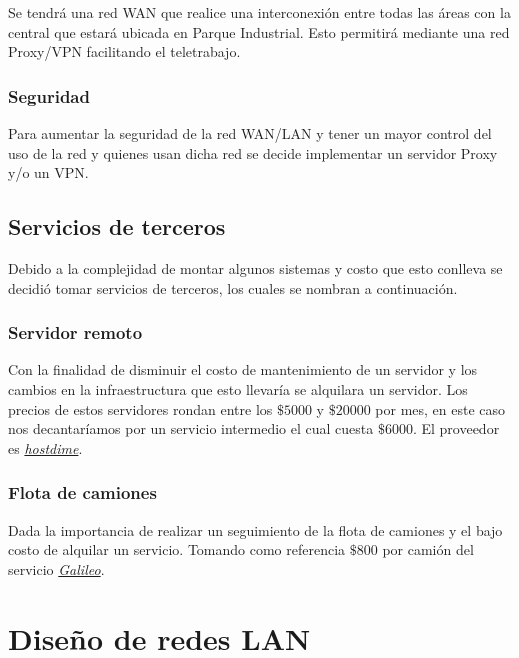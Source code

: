 \documentclass[11pt]{article}
\begin{document}
        Se tendrá una red WAN que realice una interconexión entre todas las áreas con la central que estará ubicada en Parque Industrial.
        Esto permitirá mediante una red Proxy/VPN facilitando el teletrabajo.

        \subsubsection*{Seguridad}

        Para aumentar la seguridad de la red WAN/LAN y tener un mayor control del uso de la red y quienes usan dicha red 
        se decide implementar un servidor Proxy y/o un VPN.

        \subsection{Servicios de terceros}

        Debido a la complejidad de montar algunos sistemas y costo que esto conlleva se decidió tomar servicios de terceros, los 
        cuales se nombran a continuación.

        \subsubsection*{Servidor remoto}

        Con la finalidad de disminuir el costo de mantenimiento de un servidor y los cambios en la infraestructura que esto llevaría se 
        alquilara un servidor. Los precios de estos servidores rondan entre los $\$5000$ y $\$20000$ por mes, en este 
        caso nos decantaríamos por un servicio intermedio el cual cuesta $\$6000$. El proveedor es \href{https://www.hostdime.com.ar/servidores-dedicados}{\textit{hostdime}}.

        \subsubsection*{Flota de camiones}

        Dada la importancia de realizar un seguimiento de la flota de camiones y el bajo costo de alquilar un servicio.
        Tomando como referencia $\$800$ por camión del servicio \href{https://galileosatelital.com/rastreo-vehicular-gps}{\textit{Galileo}}.
        
    \section{Diseño de redes LAN}
\end{document}
